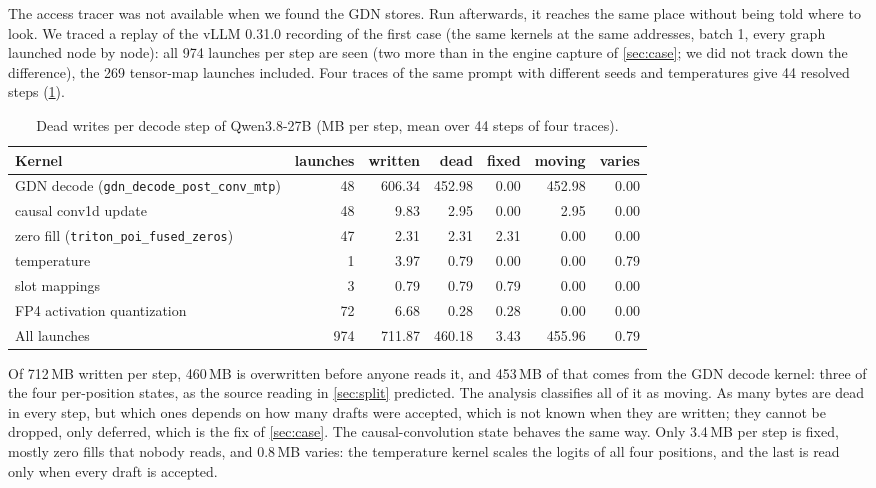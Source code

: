 The access tracer was not available when we found the GDN stores. Run afterwards, it reaches the
same place without being told where to look. We traced a replay of the vLLM 0.31.0 recording of the
first case (the same kernels at the same addresses, batch 1, every graph launched node by node):
all 974 launches per step are seen (two more than in the engine capture of
\cref{sec:case}; we did not track down the difference), the 269 tensor-map launches included. Four traces of the same
prompt with different seeds and temperatures give 44 resolved steps (\cref{tab:dead}).

\begin{table}[t]
\centering\small
\begin{tabular}{@{}lrrrrrr@{}}
\toprule
Kernel & launches & written & dead & fixed & moving & varies \\
\midrule
GDN decode (\texttt{gdn\_decode\_post\_conv\_mtp}) & 48 & 606.34 & 452.98 & 0.00 & 452.98 & 0.00 \\
causal conv1d update & 48 & 9.83 & 2.95 & 0.00 & 2.95 & 0.00 \\
zero fill (\texttt{triton\_poi\_fused\_zeros}) & 47 & 2.31 & 2.31 & 2.31 & 0.00 & 0.00 \\
temperature & 1 & 3.97 & 0.79 & 0.00 & 0.00 & 0.79 \\
slot mappings & 3 & 0.79 & 0.79 & 0.79 & 0.00 & 0.00 \\
FP4 activation quantization & 72 & 6.68 & 0.28 & 0.28 & 0.00 & 0.00 \\
\midrule
All launches & 974 & 711.87 & 460.18 & 3.43 & 455.96 & 0.79 \\
\bottomrule
\end{tabular}
\caption{Dead writes per decode step of Qwen3.8-27B (MB per step, mean over 44 steps of four traces).}\label{tab:dead}
\end{table}

Of 712\,MB written per step, 460\,MB is overwritten before anyone reads it, and 453\,MB of that
comes from the GDN decode kernel: three of the four per-position states, as the source reading in
\cref{sec:split} predicted. The analysis classifies all of it as moving. As many bytes are dead in
every step, but which ones depends on how many drafts were accepted, which is not known when they
are written; they cannot be dropped, only deferred, which is the fix of \cref{sec:case}. The
causal-convolution state behaves the same way. Only 3.4\,MB per step is fixed, mostly zero fills
that nobody reads, and 0.8\,MB varies: the temperature kernel scales the logits of all four
positions, and the last is read only when every draft is accepted.

